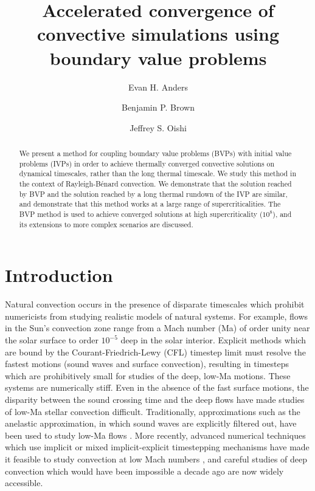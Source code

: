 \documentclass[aps, pre, onecolumn, nofootinbib, notitlepage, groupedaddress, amsfonts, amssymb, amsmath, longbibliography]{revtex4-1}
\newcommand{\RB}{Rayleigh-B\'{e}nard }
\begin{document}
\author{Evan H. Anders}
\author{Benjamin P. Brown}
\author{Jeffrey S. Oishi}
\title{Accelerated convergence of convective simulations using boundary value problems}

\begin{abstract}
We present a method for coupling boundary value problems (BVPs) with initial value problems (IVPs)
in order to achieve thermally converged convective solutions on dynamical timescales, rather than the
long thermal timescale. We study this method in the context of \RB convection. 
We demonstrate that the solution reached by BVP and the
solution reached by a long thermal rundown of the IVP are similar, and demonstrate that this method works at a
large range of supercriticalities.  The BVP method is used to achieve converged solutions at high supercriticality ($10^8$),
and its extensions to more complex scenarios are discussed.
\end{abstract}
\maketitle


\section{Introduction}
\label{sec:intro}
Natural convection occurs in the presence of disparate timescales which
prohibit numericists from studying realistic models of natural systems.  For example,
flows in the Sun's convection zone range from a Mach number (Ma) of order unity
near the solar surface to order $10^{-5}$ deep in the solar interior.
Explicit methods which are bound by the Courant-Friedrich-Lewy
(CFL) timestep limit must resolve the fastest motions (sound
waves and surface convection), resulting in timesteps which are prohibitively
small for studies of the deep, low-Ma motions. These systems are numerically
stiff. Even in the absence of the fast surface motions, the disparity between
the sound crossing time and the deep flows have made studies of low-Ma stellar
convection difficult. Traditionally, approximations such as
the anelastic approximation, in which sound waves are explicitly filtered out,
have been used to study low-Ma flows \cite{brown&all2010, featherstone&hindman2016}.
More recently, advanced numerical techniques which use implicit or mixed
implicit-explicit timestepping mechanisms have made it feasible to study
convection at low Mach numbers \cite{viallet&all2011, viallet&all2013, viallet&all2016, lecoanet&all2014,
anders&brown2017, bordwell&all2018}, and careful studies of deep convection which
would have been impossible a decade ago are now widely accessible.
\end{document}

